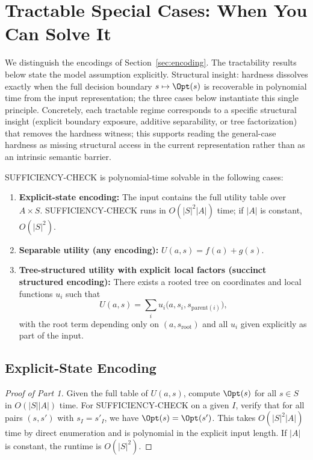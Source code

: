 \section{Tractable Special Cases: When You Can Solve It}\label{sec:tractable}

We distinguish the encodings of Section~\ref{sec:encoding}. The tractability results below state the model assumption explicitly.
Structural insight: hardness dissolves exactly when the full decision boundary $s \mapsto \Opt(s)$ is recoverable in polynomial time from the input representation; the three cases below instantiate this single principle.
Concretely, each tractable regime corresponds to a specific structural insight (explicit boundary exposure, additive separability, or tree factorization) that removes the hardness witness; this supports reading the general-case hardness as missing structural access in the current representation rather than as an intrinsic semantic barrier.

\begin{theorem}\label{thm:tractable}
SUFFICIENCY-CHECK is polynomial-time solvable in the following cases:
\begin{enumerate}
\item \textbf{Explicit-state encoding:} The input contains the full utility table over $A \times S$. SUFFICIENCY-CHECK runs in $O(|S|^2|A|)$ time; if $|A|$ is constant, $O(|S|^2)$.
\item \textbf{Separable utility (any encoding):} $U(a, s) = f(a) + g(s)$.
\item \textbf{Tree-structured utility with explicit local factors (succinct structured encoding):} There exists a rooted tree on coordinates and local functions $u_i$ such that
\[
U(a,s) = \sum_i u_i\bigl(a, s_i, s_{\mathrm{parent}(i)}\bigr),
\]
with the root term depending only on $(a, s_{\mathrm{root}})$ and all $u_i$ given explicitly as part of the input.
\end{enumerate}
\end{theorem}

\subsection{Explicit-State Encoding}

\begin{proof}[Proof of Part 1]
Given the full table of $U(a,s)$, compute $\Opt(s)$ for all $s \in S$ in $O(|S||A|)$ time. For SUFFICIENCY-CHECK on a given $I$, verify that for all pairs $(s,s')$ with $s_I = s'_I$, we have $\Opt(s) = \Opt(s')$. This takes $O(|S|^2|A|)$ time by direct enumeration and is polynomial in the explicit input length. If $|A|$ is constant, the runtime is $O(|S|^2)$.
\end{proof}

